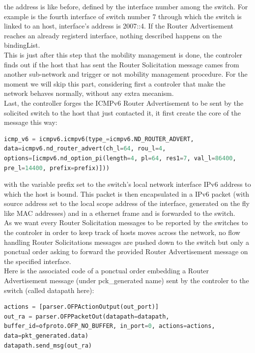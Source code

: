 \documentclass{article}
\begin{document}
the address is like before, defined by the interface number among the
switch. For example is the fourth interface of switch number 7 through
which the switch is linked to an host, interface's address is 2007::4.
If the Router Advertisement reaches an already registerd interface,
nothing described happens on the bindingList.\\
\newline
This is just after this step that the mobility management is done,
the controler finds out if the host that has sent the Router
Solicitation message cames from another sub-network and trigger or
not mobility management procedure. For the moment we will skip this
part, considering first a controler that make the network behaves
normally, without any extra mecanism.\\
\newline
Last, the controller forges the ICMPv6 Router Advertisement to be sent
by the solicited switch to the host that just contacted it, it first
create the core of the message this way: 

\begin{lstlisting}[frame=single,language=Python,breaklines=true ] 
icmp_v6 = icmpv6.icmpv6(type_=icmpv6.ND_ROUTER_ADVERT,
data=icmpv6.nd_router_advert(ch_l=64, rou_l=4,
options=[icmpv6.nd_option_pi(length=4, pl=64, res1=7, val_l=86400,
pre_l=14400, prefix=prefix)]))
\end{lstlisting}

with the variable prefix set to the switch's local network interface
IPv6 address to which the host is bound. This packet is then
encapsulated in a IPv6 packet (with source address set to the local
scope address of the interface, generated on the fly like MAC
addresses) and in a ethernet frame and is forwarded to the switch.\\ 
\newline
As we want every Router Solicitation messages to be reported by the
switches to the controler in order to keep track of hosts moves across
the network, no flow handling Router Solicitations messages are pushed
down to the switch but only a ponctual order asking to forward the
provided Router Advertisement message on the specified interface.\\
\newline
Here is the associated code of a ponctual order embedding a Router
Advertisement message (under pck_generated name) sent by the controler
to the switch (called datapath here):

\begin{lstlisting}[frame=single,language=Python, breaklines=true] 
actions = [parser.OFPActionOutput(out_port)] 
out_ra = parser.OFPPacketOut(datapath=datapath,
buffer_id=ofproto.OFP_NO_BUFFER, in_port=0, actions=actions,
data=pkt_generated.data) 
datapath.send_msg(out_ra)
\end{lstlisting}
\end{document}
